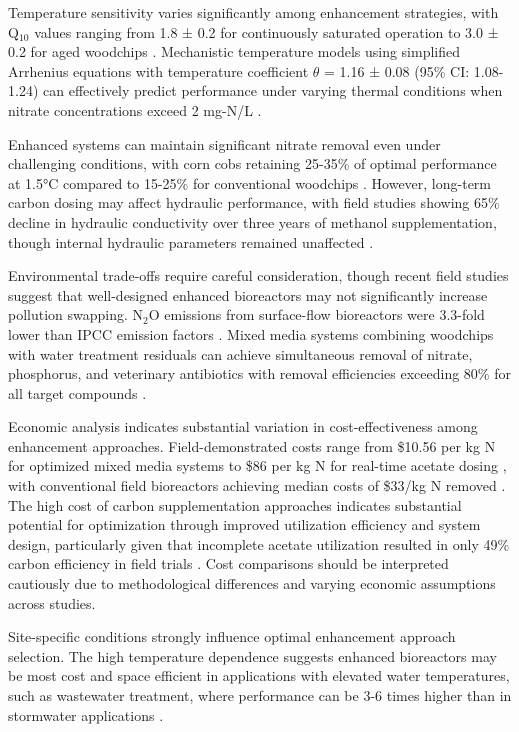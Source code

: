\documentclass[12pt,a4paper]{article}
\begin{document}
Temperature sensitivity varies significantly among enhancement strategies, with Q$_{10}$ values ranging from 1.8 ± 0.2 for continuously saturated operation to 3.0 ± 0.2 for aged woodchips \citep{RN228}. Mechanistic temperature models using simplified Arrhenius equations with temperature coefficient $\theta$ = 1.16 ± 0.08 (95\% CI: 1.08-1.24) can effectively predict performance under varying thermal conditions when nitrate concentrations exceed 2 mg-N/L \citep{RN242}.

Enhanced systems can maintain significant nitrate removal even under challenging conditions, with corn cobs retaining 25-35\% of optimal performance at 1.5°C compared to 15-25\% for conventional woodchips \citep{RN350, RN624}. However, long-term carbon dosing may affect hydraulic performance, with field studies showing 65\% decline in hydraulic conductivity over three years of methanol supplementation, though internal hydraulic parameters remained unaffected \citep{RN632}.

Environmental trade-offs require careful consideration, though recent field studies suggest that well-designed enhanced bioreactors may not significantly increase pollution swapping. N$_{2}$O emissions from surface-flow bioreactors were 3.3-fold lower than IPCC emission factors \citep{RN1181}. Mixed media systems combining woodchips with water treatment residuals can achieve simultaneous removal of nitrate, phosphorus, and veterinary antibiotics with removal efficiencies exceeding 80\% for all target compounds \citep{RN282}.

Economic analysis indicates substantial variation in cost-effectiveness among enhancement approaches. Field-demonstrated costs range from \$10.56 per kg N for optimized mixed media systems \citep{RN350} to \$86 per kg N for real-time acetate dosing \citep{RN196}, with conventional field bioreactors achieving median costs of \$33/kg N removed \citep{RN289}. The high cost of carbon supplementation approaches indicates substantial potential for optimization through improved utilization efficiency and system design, particularly given that incomplete acetate utilization resulted in only 49\% carbon efficiency in field trials \citep{RN196}. Cost comparisons should be interpreted cautiously due to methodological differences and varying economic assumptions across studies.

Site-specific conditions strongly influence optimal enhancement approach selection. The high temperature dependence suggests enhanced bioreactors may be most cost and space efficient in applications with elevated water temperatures, such as wastewater treatment, where performance can be 3-6 times higher than in stormwater applications \citep{RN258, RN315}.
\end{document}
